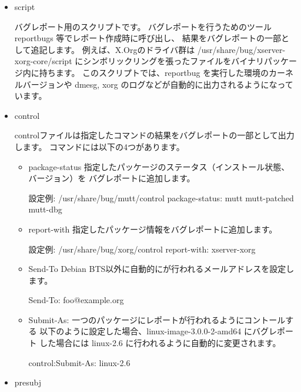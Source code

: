 \documentclass[mingoth,a4paper]{jsarticle}
\begin{document}
\begin{itemize}
\item script

バグレポート用のスクリプトです。
バグレポートを行うためのツールreportbugs 等でレポート作成時に呼び出し、
結果をバグレポートの一部として追記します。
例えば、X.Orgのドライバ群は /usr/share/bug/xserver-xorg-core/script 
にシンボリックリングを張ったファイルをバイナリパッケージ内に持ちます。
このスクリプトでは、reportbug を実行した環境のカーネルバージョンや 
dmesg, xorg のログなどが自動的に出力されるようになっています。

\item control

controlファイルは指定したコマンドの結果をバグレポートの一部として出力します。
コマンドには以下の4つがあります。

\begin{itemize}
\item package-status
指定したパッケージのステータス（インストール状態、バージョン）を
バグレポートに追加します。

\begin{commandline}
設定例:
/usr/share/bug/mutt/control package-status: mutt mutt-patched mutt-dbg
\end{commandline}

\item report-with
指定したパッケージ情報をバグレポートに追加します。

\begin{commandline}
設定例:
/usr/share/bug/xorg/control report-with: xserver-xorg
\end{commandline}

\item Send-To
Debian BTS以外に自動的にが行われるメールアドレスを設定します。

\begin{commandline}
Send-To: foo@example.org
\end{commandline}

\item Submit-As:
一つのパッケージにレポートが行われるようにコントールする
以下のように設定した場合、linux-image-3.0.0-2-amd64 にバグレポート
した場合には linux-2.6 に行われるように自動的に変更されます。

\begin{commandline}
control:Submit-As: linux-2.6
\end{commandline}
\end{itemize}

\item presubj


\end{itemize}
\end{document}
